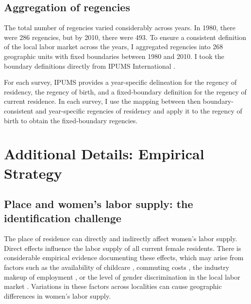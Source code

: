 \subsection{Aggregation of regencies}
\label{sec:regency_aggregation}
The total number of regencies varied considerably across years. In 1980, there were 286 regencies, but by 2010, there were 493. To ensure a consistent definition of the local labor market across the years, I aggregated regencies into 268 geographic units with fixed boundaries between 1980 and 2010. I took the boundary definitions directly from IPUMS International \citep{MinnesotaPopulationCenter2020}.

For each survey, IPUMS provides a year-specific delineation for the regency of residency, the regency of birth, and a 
fixed-boundary definition for the regency of current residence. In each survey, I use the mapping between then boundary-consistent and year-specific regencies of residency and apply it to the regency of birth to obtain the fixed-boundary regencies.






\section{Additional Details: Empirical Strategy}
\label{sec:ap_empirical}

\subsection{Place and women's labor supply: the identification challenge}
\label{sec:model_explanation}


The place of residence can directly and indirectly affect women's labor supply. Direct effects influence the labor supply of all current female residents. There is considerable empirical evidence documenting these effects, which may arise from factors such as the availability of childcare \citep{Compton2014}, commuting costs \citep{LeBarbanchon2021, Farre2021}, the industry makeup of employment \citep{Olivetti2014}, or the level of gender discrimination in the local labor market \citep{Charles2018}. Variations in these factors across localities can cause geographic differences in women's labor supply.


